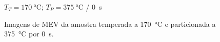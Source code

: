 \begin{figure}
  \centering
  $T_T = \SI{170}{\degreeCelsius}$; $T_P = \SI{375}{\degreeCelsius}$ / \SI{0}{s}\\
  \quad
  \caption{Imagens de MEV da amostra temperada a \SI{170}{\degreeCelsius} e particionada a \SI{375}{\degreeCelsius} por 0~s.}
  \label{fig:TP375-0_MEV}
\end{figure}

